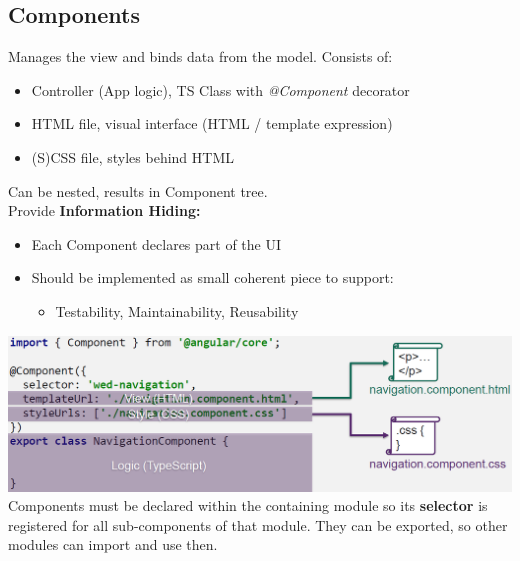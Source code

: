 \subsection{Components}
Manages the view and binds data from the model. Consists of:
\begin{itemize}
    \item Controller (App logic), TS Class with \textit{@Component} decorator
    \item HTML file, visual interface (HTML / template expression)
    \item (S)CSS file, styles behind HTML
\end{itemize}
Can be nested, results in Component tree.\\
Provide \textbf{Information Hiding:}
\begin{itemize}
    \item Each Component declares part of the UI
    \item Should be implemented as small coherent piece to support:
    \begin{itemize}
        \item Testability, Maintainability, Reusability
    \end{itemize}
\end{itemize}
\includegraphics[width=\linewidth]{img/angular_component_declaration.png}
Components must be declared within the containing module so its \textbf{selector} is registered for all sub-components of that module.
They can be exported, so other modules can import and use then.

